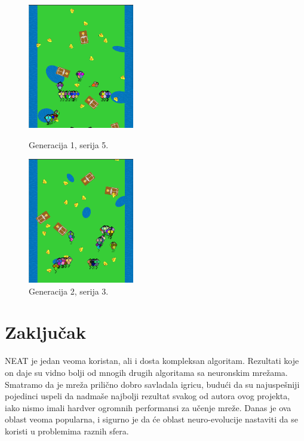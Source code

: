 \documentclass[a4paper]{article}
\begin{document}
\begin{figure}[!h]
  \centering
  \begin{minipage}[b]{0.4\textwidth}
    \includegraphics[width=175px]{gen1_batch5.png}
    \caption{Generacija 1, serija 5.}
    \label{fig:gen0batch1}
  \end{minipage}
  \hfill
  \begin{minipage}[b]{0.4\textwidth}
    \includegraphics[width=175px]{gen2_batch3.png}
    \caption{Generacija 2, serija 3.}
    \label{fig:gen1batch1}
  \end{minipage}
\end{figure}

\pagebreak

\section{Zaključak}
\label{sec:zakljucak}

NEAT je jedan veoma koristan, ali i dosta kompleksan algoritam. Rezultati koje on daje su vidno bolji od mnogih drugih algoritama sa neuronskim mrežama. Smatramo da je mreža prilično dobro savladala igricu, budući da su najuspešniji pojedinci uspeli da nadmaše najbolji rezultat svakog od autora ovog projekta, iako nismo imali hardver ogromnih performansi za učenje mreže. Danas je ova oblast veoma popularna, i sigurno je da će oblast neuro-evolucije nastaviti da se koristi u problemima raznih sfera.

\pagebreak

\appendix
 

\end{document}
